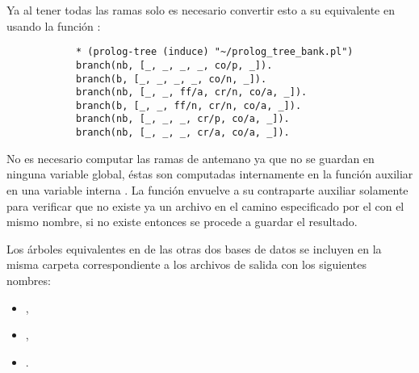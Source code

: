\begin{itemize}
\begin{solution}
        Ya al tener todas las ramas solo es necesario convertir esto a su equivalente en  usando la función :
        \begin{verbatim}
            * (prolog-tree (induce) "~/prolog_tree_bank.pl")
            branch(nb, [_, _, _, _, co/p, _]).
            branch(b, [_, _, _, _, co/n, _]).
            branch(nb, [_, _, ff/a, cr/n, co/a, _]).
            branch(b, [_, _, ff/n, cr/n, co/a, _]).
            branch(nb, [_, _, _, cr/p, co/a, _]).
            branch(nb, [_, _, _, cr/a, co/a, _]).
        \end{verbatim}

        No es necesario computar las ramas de antemano ya que no se guardan en ninguna variable global, éstas son computadas internamente en la función auxiliar  en una variable interna . La función  envuelve a su contraparte auxiliar solamente para verificar que no existe ya un archivo en el camino especificado por el  con el mismo nombre, si no existe entonces se procede a guardar el resultado. 
    
        Los árboles equivalentes en  de las otras dos bases de datos se incluyen en la misma carpeta correspondiente a los archivos de salida con los siguientes nombres:
        \begin{itemize}
            \item {},
            \item {},
            \item {}.
        \end{itemize}


\end{solution}
\end{itemize}
